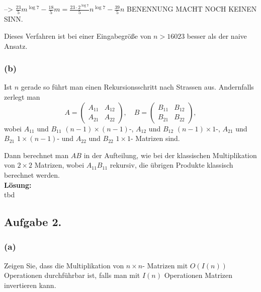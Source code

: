 \documentclass[11pt,a4paper,ngerman]{article}
\begin{document}
--> $\frac{23}{5}m^{\log 7} - \frac{18}{5}m = \frac{23\cdot 2^{\log 7}}{5} n^{\log 7} - \frac{39}{5}n$
BENENNUNG MACHT NOCH KEINEN SINN.


Dieses Verfahren ist bei einer Eingabegröße von $n > 16023$ besser als der naive Ansatz.

\subsubsection*{(b)}

Ist $n$ gerade so führt man einen Rekursionsschritt nach Strassen aus.
Andernfalls zerlegt man
$$
A = \left( \begin{array}{cc} A_{11} & A_{12}\\A_{21} & A_{22}\end{array} \right),
\quad
B = \left( \begin{array}{cc} B_{11} & B_{12}\\B_{21} & B_{22}\end{array} \right),
$$
wobei $A_{11}$ und $B_{11}$ $(n-1) \times (n-1)$-, $A_{12}$ und $B_{12}$ $(n-1)\times 1$-, $A_{21}$ und $B_{21}$ $1\times (n-1)$- und $A_{22}$ und $B_{22}$ $1 \times 1$- Matrizen sind.

Dann berechnet man $AB$ in der Aufteilung, wie bei der klassischen Multiplikation von $2\times 2$ Matrizen, wobei $A_{11}B_{11}$ rekursiv, die übrigen Produkte klassisch berechnet werden.\\

\textbf{Lösung:}\\

tbd

\subsection*{Aufgabe 2.}

\subsubsection*{(a)}

Zeigen Sie, dass die Multiplikation von $n \times n$- Matrizen mit $O(I(n))$ Operationen durchführbar ist, falls man mit $I(n)$ Operationen Matrizen invertieren kann.\\
\end{document}
